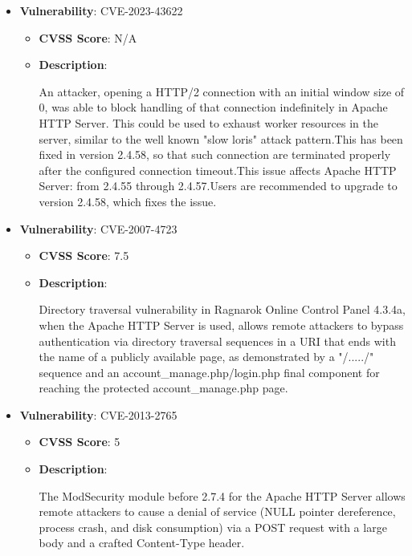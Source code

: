 \documentclass{article}
\begin{document}
\begin{itemize}
        \item \textbf{Vulnerability}: CVE-2023-43622
        \begin{itemize}
            \item \textbf{CVSS Score}:  N/A 
            \item \textbf{Description}:
            \parbox[t]{0.9\linewidth}{
                \ttfamily An attacker, opening a HTTP/2 connection with an initial window size of 0, was able to block handling of that connection indefinitely in Apache HTTP Server. This could be used to exhaust worker resources in the server, similar to the well known "slow loris" attack pattern.This has been fixed in version 2.4.58, so that such connection are terminated properly after the configured connection timeout.This issue affects Apache HTTP Server: from 2.4.55 through 2.4.57.Users are recommended to upgrade to version 2.4.58, which fixes the issue.
            }
        \end{itemize}
    
        \item \textbf{Vulnerability}: CVE-2007-4723
        \begin{itemize}
            \item \textbf{CVSS Score}:  7.5 
            \item \textbf{Description}:
            \parbox[t]{0.9\linewidth}{
                \ttfamily Directory traversal vulnerability in Ragnarok Online Control Panel 4.3.4a, when the Apache HTTP Server is used, allows remote attackers to bypass authentication via directory traversal sequences in a URI that ends with the name of a publicly available page, as demonstrated by a "/...../" sequence and an account\_manage.php/login.php final component for reaching the protected account\_manage.php page.
            }
        \end{itemize}
    
        \item \textbf{Vulnerability}: CVE-2013-2765
        \begin{itemize}
            \item \textbf{CVSS Score}:  5 
            \item \textbf{Description}:
            \parbox[t]{0.9\linewidth}{
                \ttfamily The ModSecurity module before 2.7.4 for the Apache HTTP Server allows remote attackers to cause a denial of service (NULL pointer dereference, process crash, and disk consumption) via a POST request with a large body and a crafted Content-Type header.
            }
        \end{itemize}
    

\end{itemize}
\end{document}
